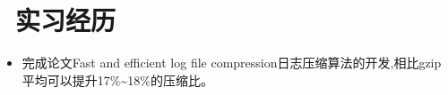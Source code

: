 \documentclass{resume}
\begin{document}




\vspace{-1ex}
\section{\faSitemap\ 实习经历}
\begin{onehalfspacing}
\begin{itemize}
  \item 完成论文Fast and efficient log file compression日志压缩算法的开发,相比gzip平均可以提升17\%\textasciitilde18\%的压缩比。
\end{itemize}
\end{onehalfspacing}

\vspace{-1.5ex}

\end{document}
